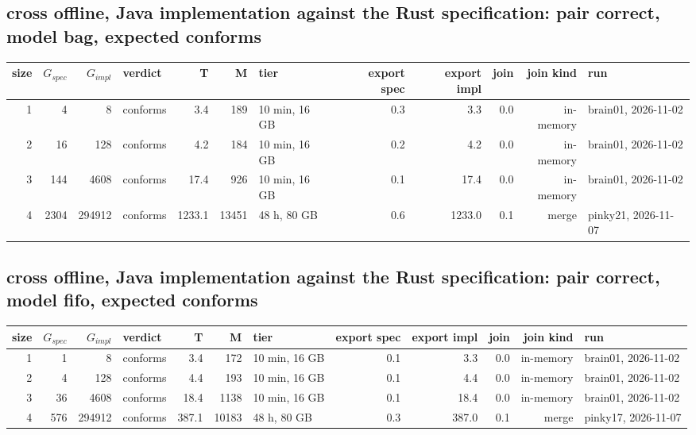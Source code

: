 \documentclass[10pt]{article}
\begin{document}
\subsection*{cross offline, Java implementation against the Rust specification: pair \textsf{correct}, model bag, expected conforms}
\begin{longtable}{@{}rrrlrrlrrrrl@{}}
\toprule
size & $G_{\mathit{spec}}$ & $G_{\mathit{impl}}$ & verdict & T & M & tier & export spec & export impl & join & join kind & run \\
\midrule
\endhead
\color{red} 1 & 4 & 8 & conforms & 3.4 & 189 & 10 min, 16 GB & 0.3 & 3.3 & 0.0 & in-memory & brain01, 2026-11-02 \\
\color{red} 2 & 16 & 128 & conforms & 4.2 & 184 & 10 min, 16 GB & 0.2 & 4.2 & 0.0 & in-memory & brain01, 2026-11-02 \\
\color{red} 3 & 144 & 4608 & conforms & 17.4 & 926 & 10 min, 16 GB & 0.1 & 17.4 & 0.0 & in-memory & brain01, 2026-11-02 \\
\color{red} 4 & 2304 & 294912 & conforms & 1233.1 & 13451 & 48 h, 80 GB & 0.6 & 1233.0 & 0.1 & merge & pinky21, 2026-11-07 \\
\bottomrule
\end{longtable}
\subsection*{cross offline, Java implementation against the Rust specification: pair \textsf{correct}, model fifo, expected conforms}
\begin{longtable}{@{}rrrlrrlrrrrl@{}}
\toprule
size & $G_{\mathit{spec}}$ & $G_{\mathit{impl}}$ & verdict & T & M & tier & export spec & export impl & join & join kind & run \\
\midrule
\endhead
\color{red} 1 & 1 & 8 & conforms & 3.4 & 172 & 10 min, 16 GB & 0.1 & 3.3 & 0.0 & in-memory & brain01, 2026-11-02 \\
\color{red} 2 & 4 & 128 & conforms & 4.4 & 193 & 10 min, 16 GB & 0.1 & 4.4 & 0.0 & in-memory & brain01, 2026-11-02 \\
\color{red} 3 & 36 & 4608 & conforms & 18.4 & 1138 & 10 min, 16 GB & 0.1 & 18.4 & 0.0 & in-memory & brain01, 2026-11-02 \\
\color{red} 4 & 576 & 294912 & conforms & 387.1 & 10183 & 48 h, 80 GB & 0.3 & 387.0 & 0.1 & merge & pinky17, 2026-11-07 \\
\bottomrule
\end{longtable}
\end{document}
